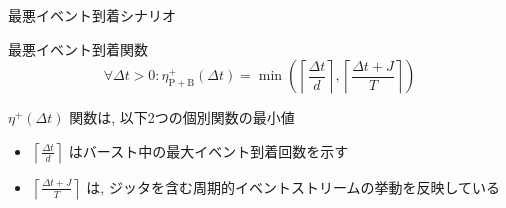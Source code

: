 \begin{frame}{最悪イベント到着シナリオ}
\end{frame}




\begin{frame}{最悪イベント到着関数}
    \begin{equation*}
        \forall \Delta t>0: \eta_{\mathrm{P}+\mathrm{B}}^{+}(\Delta t)=\min \left(\left\lceil\frac{\Delta t}{d}\right\rceil,\left\lceil\frac{\Delta t+J}{T}\right\rceil\right)
    \end{equation*}

    $\eta^{+}(\Delta t)$ 関数は, 以下2つの個別関数の最小値
    \begin{itemize}
        \item $\left\lceil\frac{\Delta t}{d}\right\rceil$ はバースト中の最大イベント到着回数を示す
        \item $\left\lceil\frac{\Delta t+J}{T}\right\rceil$ は, ジッタを含む周期的イベントストリームの挙動を反映している
    \end{itemize}
\end{frame}

